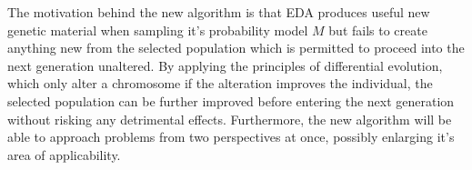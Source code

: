 The motivation behind the new algorithm is that EDA produces useful new genetic material when sampling it's probability model $M$ but fails to create anything new from the selected population which is permitted to proceed into the next generation unaltered. By applying the principles of differential evolution, which only alter a chromosome if the alteration improves the individual, the selected population can be further improved before entering the next generation without risking any detrimental effects. Furthermore, the new algorithm will be able to approach problems from two perspectives at once, possibly enlarging it's area of applicability.
